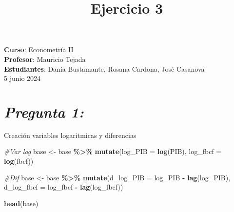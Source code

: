 \documentclass[
  12pt,
]{article}
\title{\textbf{Ejercicio 3}}
\author{}
\date{\vspace{-2.5em}}
\newenvironment{Shaded}{\begin{snugshade}}{\end{snugshade}}
\newcommand{\AttributeTok}[1]{\textcolor[rgb]{0.13,0.29,0.53}{#1}}
\newcommand{\CommentTok}[1]{\textcolor[rgb]{0.56,0.35,0.01}{\textit{#1}}}
\newcommand{\DecValTok}[1]{\textcolor[rgb]{0.00,0.00,0.81}{#1}}
\newcommand{\FunctionTok}[1]{\textcolor[rgb]{0.13,0.29,0.53}{\textbf{#1}}}
\newcommand{\NormalTok}[1]{#1}
\newcommand{\OtherTok}[1]{\textcolor[rgb]{0.56,0.35,0.01}{#1}}
\newcommand{\SpecialCharTok}[1]{\textcolor[rgb]{0.81,0.36,0.00}{\textbf{#1}}}
\newcommand{\StringTok}[1]{\textcolor[rgb]{0.31,0.60,0.02}{#1}}
\begin{document}
\maketitle

\maketitle
\vspace{-5em}
\vspace{0.5em}

\begin{center}
\footnotesize \textbf{Curso}: Econometría II \\
\footnotesize \textbf{Profesor}: Mauricio Tejada \\
\footnotesize \textbf{Estudiantes}: Dania Bustamante, Rosana Cardona, José Casanova \\
\footnotesize 5 junio 2024 \\
\end{center}

\begin{Shaded}
\end{Shaded}

\section{\texorpdfstring{\textbf{\emph{Pregunta
1:}}}{Pregunta 1:}}\label{pregunta-1}

Creación variables logaritmicas y diferencias

\begin{Shaded}
\begin{Highlighting}[]
\CommentTok{\#Var log}
\NormalTok{base }\OtherTok{\textless{}{-}}\NormalTok{ base }\SpecialCharTok{\%\textgreater{}\%} \FunctionTok{mutate}\NormalTok{(}\AttributeTok{log\_PIB =} \FunctionTok{log}\NormalTok{(PIB), }\AttributeTok{log\_fbcf =} \FunctionTok{log}\NormalTok{(fbcf))}

\CommentTok{\#Dif}
\NormalTok{base }\OtherTok{\textless{}{-}}\NormalTok{ base }\SpecialCharTok{\%\textgreater{}\%}   \FunctionTok{mutate}\NormalTok{(}\AttributeTok{d\_log\_PIB =}\NormalTok{ log\_PIB }\SpecialCharTok{{-}} \FunctionTok{lag}\NormalTok{(log\_PIB), }\AttributeTok{d\_log\_fbcf =}\NormalTok{ log\_fbcf }\SpecialCharTok{{-}} \FunctionTok{lag}\NormalTok{(log\_fbcf))}

\FunctionTok{head}\NormalTok{(base)}
\end{Highlighting}
\end{Shaded}
\end{document}
